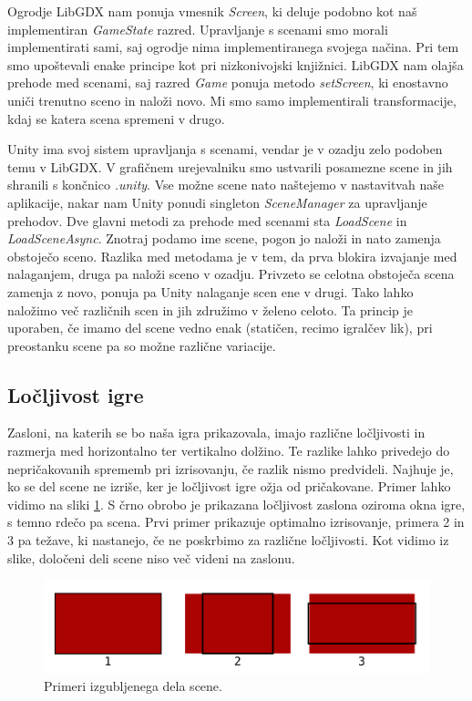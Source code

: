 \documentclass[12pt,a4paper,twoside]{book}
\begin{document}
Ogrodje LibGDX nam ponuja vmesnik \textit{Screen}, ki deluje podobno kot naš implementiran \textit{GameState} razred. Upravljanje s scenami smo morali implementirati sami, saj ogrodje nima implementiranega svojega načina. Pri tem smo upoštevali enake principe kot pri nizkonivojski knjižnici. LibGDX nam olajša prehode med scenami, saj razred \textit{Game} ponuja metodo \textit{setScreen}, ki enostavno uniči trenutno sceno in naloži novo. Mi smo samo implementirali transformacije, kdaj se katera scena spremeni v drugo.

Unity ima svoj sistem upravljanja s scenami, vendar je v ozadju zelo podoben temu v LibGDX. V grafičnem urejevalniku smo ustvarili posamezne scene in jih shranili s končnico \textit{.unity}. Vse možne scene nato naštejemo v nastavitvah naše aplikacije, nakar nam Unity ponudi singleton \textit{SceneManager} za upravljanje prehodov. Dve glavni metodi za prehode med scenami sta \textit{LoadScene} in \textit{LoadSceneAsync}. Znotraj podamo ime scene, pogon jo naloži in nato zamenja obstoječo sceno. Razlika med metodama je v tem, da prva blokira izvajanje med nalaganjem, druga pa naloži sceno v ozadju. Privzeto se celotna obstoječa scena zamenja z novo, ponuja pa Unity nalaganje scen ene v drugi. Tako lahko naložimo več različnih scen in jih združimo v želeno celoto. Ta princip je uporaben, če imamo del scene vedno enak (statičen, recimo igralčev lik), pri preostanku scene pa so možne različne variacije.

\subsection{Ločljivost igre}
Zasloni, na katerih se bo naša igra prikazovala, imajo različne ločljivosti in razmerja med horizontalno ter vertikalno dolžino. Te razlike lahko privedejo do nepričakovanih sprememb pri izrisovanju, če razlik nismo predvideli. Najhuje je, ko se del scene ne izriše, ker je ločljivost igre ožja od pričakovane. Primer lahko vidimo na sliki \ref{slika:rezanje}. S črno obrobo je prikazana ločljivost zaslona oziroma okna igre, s temno rdečo pa scena. Prvi primer prikazuje optimalno izrisovanje, primera 2 in 3 pa težave, ki nastanejo, če ne poskrbimo za različne ločljivosti. Kot vidimo iz slike, določeni deli scene niso več videni na zaslonu.

\begin{figure}[h]
	\centering
	\includegraphics[width=12cm]{rezanjeResolucije}
	\caption{Primeri izgubljenega dela scene.}
	\label{slika:rezanje}
\end{figure}
\end{document}

